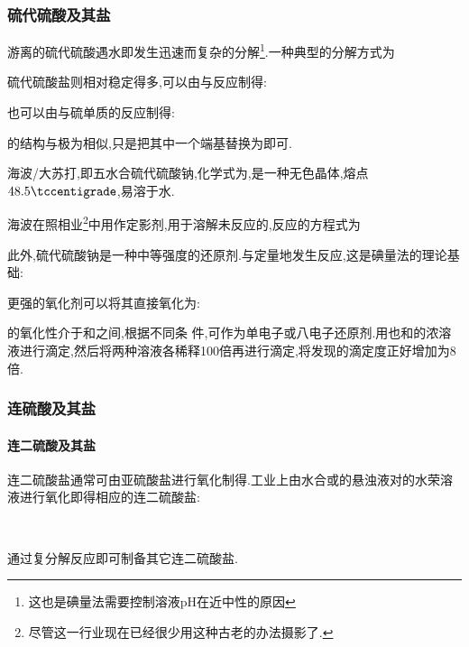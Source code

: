 \documentclass{ctexart}
\begin{document}
\subsubsection{硫代硫酸及其盐}
游离的硫代硫酸遇水即发生迅速而复杂的分解\footnote{这也是碘量法需要控制溶液pH在近中性的原因}.一种典型的分解方式为
\begin{center}
\end{center}
硫代硫酸盐则相对稳定得多,可以由与反应制得:
\begin{center}
\end{center}
也可以由与硫单质的反应制得:
\begin{center}
\end{center}
\indent {}的结构与极为相似,只是把其中一个端基替换为即可.
\begin{substance}[\ce{Na2S2O3.5H2O}]
    海波/大苏打,即五水合硫代硫酸钠,化学式为,是一种无色晶体,熔点$48.5\tccentigrade$,易溶于水.
\end{substance}
海波在照相业\footnote{尽管这一行业现在已经很少用这种古老的办法摄影了.}中用作定影剂,用于溶解未反应的,反应的方程式为
\begin{center}
\end{center}
此外,硫代硫酸钠是一种中等强度的还原剂.与定量地发生反应,这是碘量法的理论基础:
\begin{center}
\end{center}
更强的氧化剂可以将其直接氧化为:
\begin{center}
\end{center}
的氧化性介于和之间,根据不同条
件,可作为单电子或八电子还原剂.用也和的浓溶液进行滴定,然后将两种溶液各稀释100倍再进行滴定,将发现的滴定度正好增加为8倍.
\subsubsection{连硫酸及其盐}
\paragraph{连二硫酸及其盐}
连二硫酸盐通常可由亚硫酸盐进行氧化制得.工业上由水合或的悬浊液对的水荣溶液进行氧化即得相应的连二硫酸盐:
\begin{center}
    \\
\end{center}
通过复分解反应即可制备其它连二硫酸盐.
\end{document}
